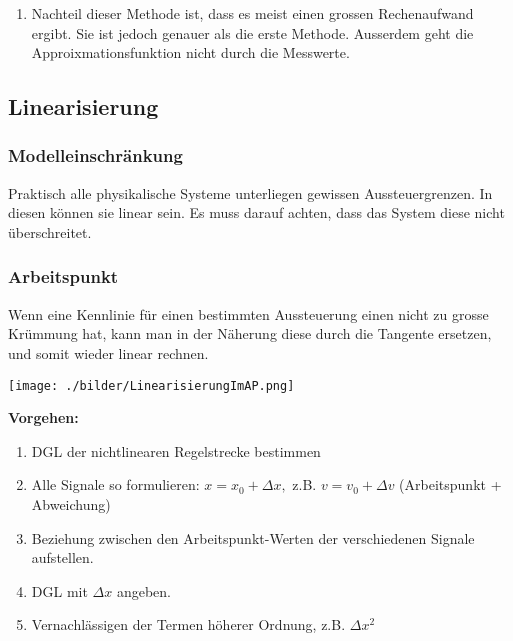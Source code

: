 \begin{enumerate}[start=2]
\begin{enumerate}
\begin{enumerate}
								\item	Nachteil dieser Methode ist, dass es meist einen grossen
											Rechenaufwand ergibt. Sie ist jedoch genauer als die erste Methode.
											Ausserdem geht die Approixmationsfunktion nicht durch die Messwerte.
           		\end{enumerate}
		\end{enumerate}
	\end{enumerate}
    
	 
	
	\subsection{Linearisierung}
		\subsubsection{Modelleinschränkung}
			Praktisch alle physikalische Systeme unterliegen gewissen Aussteuergrenzen.
			In diesen können sie linear sein. Es muss darauf achten, dass  das System
			diese nicht überschreitet.
			
		\subsubsection{Arbeitspunkt}
			\begin{minipage}{9cm}
				Wenn eine Kennlinie für einen bestimmten Aussteuerung einen nicht zu grosse
				Krümmung hat, kann man in der Näherung diese durch die Tangente ersetzen, und
				somit wieder linear rechnen.
			\end{minipage}
			\hspace{0.5cm}
			\begin{minipage}{8cm}
				\texttt{[image: ./bilder/LinearisierungImAP.png]}
			\end{minipage}
			
			\textbf{Vorgehen:}\\
			\begin{enumerate}
				\item DGL der nichtlinearen Regelstrecke bestimmen
				\item Alle Signale so formulieren: $x = x_0 + \Delta x,$ z.B. $v=v_0 + \Delta v$ (Arbeitspunkt + Abweichung)
				\item Beziehung zwischen den Arbeitspunkt-Werten der verschiedenen Signale aufstellen.
				\item DGL mit $\Delta x$ angeben.
				\item Vernachlässigen der Termen höherer Ordnung, z.B. $\Delta x^2$
			\end{enumerate}
			
